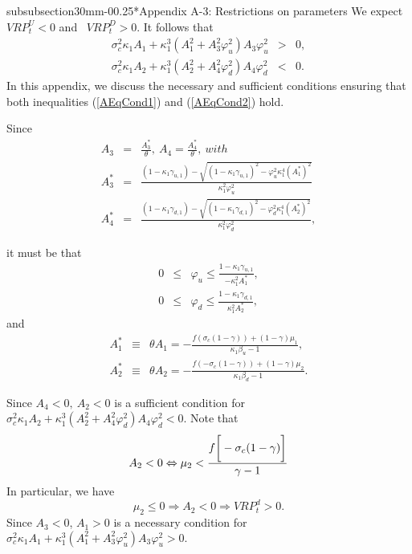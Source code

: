 \documentclass[11pt]{article}
\makeatletter
\renewcommand\subsubsection{\@startsection%
    {subsubsection}{3}{0mm}{-0\baselineskip}{0.25\baselineskip}{\itshape\large}}
\makeatother
\begin{document}
\begin{small}
\subsubsection*{Appendix A-3: Restrictions on parameters}
We expect $VRP_{t}^{U}<0$ and \ $VRP_{t}^{D}>0$. It
follows that%
\begin{eqnarray}
\sigma _{c}^{2}\kappa _{1}A_{1}+\kappa _{1}^{3}\left(
A_{1}^{2}+A_{3}^{2}\varphi _{u}^{2}\right) A_{3}\varphi _{u}^{2} &>&0,\label{AEqCond1} \\
\sigma _{c}^{2}\kappa _{1}A_{2}+\kappa _{1}^{3}\left(
A_{2}^{2}+A_{4}^{2}\varphi _{d}^{2}\right) A_{4}\varphi _{d}^{2} &<&0\label{AEqCond2}.
\end{eqnarray}%
In this appendix, we discuss the necessary and sufficient conditions ensuring that both inequalities (\ref{AEqCond1}) and (\ref{AEqCond2}) hold.

Since
\begin{eqnarray*}
A_{3} &=&\frac{A_{3}^{\ast }}{\theta },\ A_{4}=\frac{A_{4}^{\ast }}{\theta }%
,\ with \\
A_{3}^{\ast } &=&\frac{(1-\kappa _{1}\gamma _{u,1})-\sqrt{(1-\kappa
_{1}\gamma _{u,1})^{2}-\varphi _{u}^{2}\kappa _{1}^{4}\left( A_{1}^{\ast
}\right) ^{2}}}{\kappa _{1}^{2}\varphi _{u}^{2}} \\
A_{4}^{\ast } &=&\frac{(1-\kappa _{1}\gamma _{d,1})-\sqrt{(1-\kappa
_{1}\gamma _{d,1})^{2}-\varphi _{d}^{2}\kappa _{1}^{4}\left( A_{2}^{\ast
}\right) ^{2}}}{\kappa _{1}^{2}\varphi _{d}^{2}},
\end{eqnarray*}

it must be that%
\begin{eqnarray*}
0 &\leq &\varphi _{u}\leq \frac{1-\kappa _{1}\gamma _{u,1}}{-\kappa
_{1}^{2}A_{1}^{\ast }}, \\
0 &\leq &\varphi _{d}\leq \frac{1-\kappa _{1}\gamma _{d,1}}{\kappa
_{1}^{2}A_{2}^{\ast }},
\end{eqnarray*}%
and%
\begin{eqnarray}
A_{1}^{\ast } &\equiv &\theta A_{1}=-\frac{f\left( \sigma _{c}(1-\gamma
)\right) +(1-\gamma )\mu _{1}}{\kappa _{1}\beta _{u}-1}, \\
A_{2}^{\ast } &\equiv &\theta A_{2}=-\frac{f\left( -\sigma _{c}(1-\gamma
)\right) +(1-\gamma )\mu _{2}}{\kappa _{1}\beta _{d}-1}.
\end{eqnarray}

Since $A_{4}<0,\ A_{2}<0$ is a sufficient condition for $\sigma
_{c}^{2}\kappa _{1}A_{2}+\kappa _{1}^{3}\left( A_{2}^{2}+A_{4}^{2}\varphi
_{d}^{2}\right) A_{4}\varphi _{d}^{2}<0.$ Note that
\begin{equation*}
A_{2}<0\Leftrightarrow \mu _{2}<\frac{f\bigg[-\sigma _{c}(1-\gamma )\bigg]}{%
\gamma -1}
\end{equation*}%
In particular, we have
\begin{equation*}
\mu _{2}\leq 0\Rightarrow A_{2}<0\Rightarrow VRP_{t}^{d}>0.
\end{equation*}%
Since $A_{3}<0$, $A_{1}>0$ is a necessary condition for $\sigma
_{c}^{2}\kappa _{1}A_{1}+\kappa _{1}^{3}\left( A_{1}^{2}+A_{3}^{2}\varphi
_{u}^{2}\right) A_{3}\varphi _{u}^{2}>0.$


\end{small}
\end{document}
